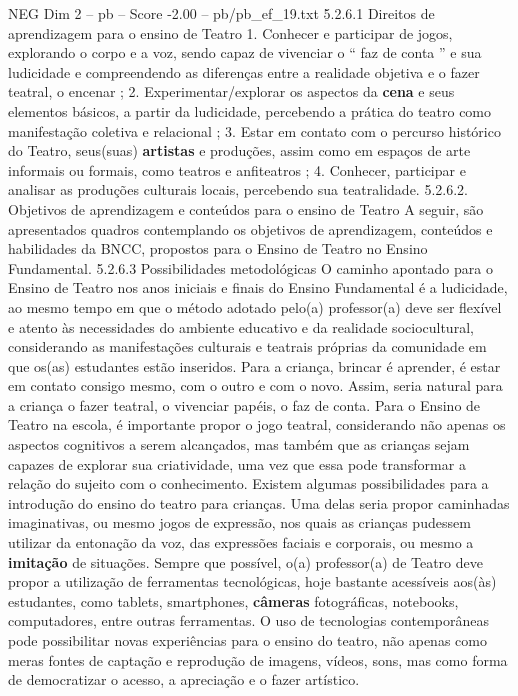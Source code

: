 \begin{textsample}{NEG Dim 2 – pb – Score -2.00 – pb/pb\_ef\_19.txt}  \label{ex:f2_neg_009}
5.2.6.1 Direitos de aprendizagem para o ensino de Teatro 1.
Conhecer e participar de jogos, explorando o corpo e a voz, sendo capaz de vivenciar o “ faz de conta ” e sua ludicidade e compreendendo as diferenças entre a realidade objetiva e o fazer teatral, o encenar ; 2.
Experimentar/explorar os aspectos da \textbf{cena} e seus elementos básicos, a partir da ludicidade, percebendo a prática do teatro como manifestação coletiva e relacional ; 3.
Estar em contato com o percurso histórico do Teatro, seus(suas) \textbf{artistas} e produções, assim como em espaços de arte informais ou formais, como teatros e anfiteatros ; 4.
Conhecer, participar e analisar as produções culturais locais, percebendo sua teatralidade. 5.2.6.2.
Objetivos de aprendizagem e conteúdos para o ensino de Teatro A seguir, são apresentados quadros contemplando os objetivos de aprendizagem, conteúdos e habilidades da BNCC, propostos para o Ensino de Teatro no Ensino Fundamental. 5.2.6.3 Possibilidades metodológicas O caminho apontado para o Ensino de Teatro nos anos iniciais e finais do Ensino Fundamental é a ludicidade, ao mesmo tempo em que o método adotado pelo(a) professor(a) deve ser flexível e atento às necessidades do ambiente educativo e da realidade sociocultural, considerando as manifestações culturais e teatrais próprias da comunidade em que os(as) estudantes estão inseridos.
Para a criança, brincar é aprender, é estar em contato consigo mesmo, com o outro e com o novo.
Assim, seria natural para a criança o fazer teatral, o vivenciar papéis, o faz de conta.
Para o Ensino de Teatro na escola, é importante propor o jogo teatral, considerando não apenas os aspectos cognitivos a serem alcançados, mas também que as crianças sejam capazes de explorar sua criatividade, uma vez que essa pode transformar a relação do sujeito com o conhecimento.
Existem algumas possibilidades para a introdução do ensino do teatro para crianças.
Uma delas seria propor caminhadas imaginativas, ou mesmo jogos de expressão, nos quais as crianças pudessem utilizar da entonação da voz, das expressões faciais e corporais, ou mesmo a \textbf{imitação} de situações.
Sempre que possível, o(a) professor(a) de Teatro deve propor a utilização de ferramentas tecnológicas, hoje bastante acessíveis aos(às) estudantes, como tablets, smartphones, \textbf{câmeras} fotográficas, notebooks, computadores, entre outras ferramentas.
O uso de tecnologias contemporâneas pode possibilitar novas experiências para o ensino do teatro, não apenas como meras fontes de captação e reprodução de imagens, vídeos, sons, mas como forma de democratizar o acesso, a apreciação e o fazer artístico.

\end{textsample}
